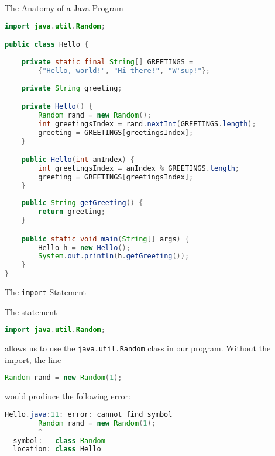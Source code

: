 \documentclass{beamer}
\author[Chris Simpkins] 
{Christopher Simpkins \\\texttt{chris.simpkins@gatech.edu}}
\institute[Georgia Tech] %
\date[CS 1331]{}
\begin{document}
\begin{frame}
  \titlepage
\end{frame}


\begin{frame}[fragile]{The Anatomy of a Java Program}


\vspace{-.1in}
\begin{lstlisting}[language=Java,textsize=8pt]
import java.util.Random;

public class Hello {
    
    private static final String[] GREETINGS =
        {"Hello, world!", "Hi there!", "W'sup!"};
    
    private String greeting;

    private Hello() {
        Random rand = new Random();
        int greetingsIndex = rand.nextInt(GREETINGS.length);
        greeting = GREETINGS[greetingsIndex];
    }

    public Hello(int anIndex) {
        int greetingsIndex = anIndex % GREETINGS.length;
        greeting = GREETINGS[greetingsIndex];
    }
    
    public String getGreeting() {
        return greeting;
    }

    public static void main(String[] args) {
        Hello h = new Hello();
        System.out.println(h.getGreeting());
    }
}
\end{lstlisting}

\end{frame}

\begin{frame}[fragile]{The {\tt import} Statement}


The statement
\begin{lstlisting}[language=Java]
import java.util.Random;
\end{lstlisting}
allows us to use the {\tt java.util.Random} class in our program.  Without the import, the line
\begin{lstlisting}[language=Java]
  Random rand = new Random(1);
\end{lstlisting}
would prodiuce the following error:
\begin{lstlisting}[language=Java]
Hello.java:11: error: cannot find symbol
        Random rand = new Random(1);
        ^
  symbol:   class Random
  location: class Hello
\end{lstlisting}

\end{frame}
\end{document}
